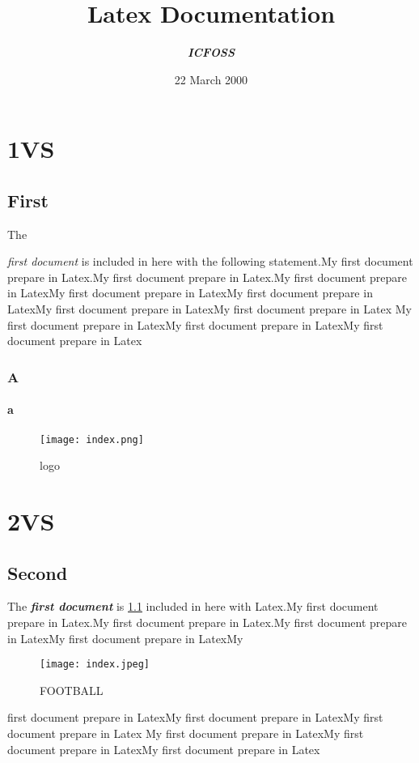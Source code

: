 \documentclass[12pt]{report} %
\begin{document}
\title{Latex Documentation}
\author{\textbf{\textit{ICFOSS}}}
\date{22 March 2000}
\maketitle

\chapter{1VS}
\section*{First}
The {\textit{first document} is included in here with the following statement.My first document prepare in Latex.My first document prepare in Latex.My first document prepare in LatexMy first document prepare in LatexMy first document prepare in LatexMy first document prepare in LatexMy first document prepare in Latex My first document prepare in LatexMy first document prepare in LatexMy first document prepare in Latex
\subsection*{A}
\subsubsection{a}

\begin{figure}
\centering
\texttt{[image: index.png]}
\caption{logo}
\label{vs}
\end{figure}

\chapter{2VS}
\section*{Second}
The \textit{\textbf{first document}} is \ref{vs}
included in here with Latex.My first document prepare in Latex.My first document prepare in Latex.My first document prepare in LatexMy first document prepare in LatexMy 

\begin{figure}[h!]
\texttt{[image: index.jpeg]}
\caption{FOOTBALL} %
\end{figure}

first document prepare in LatexMy first document prepare in LatexMy first document prepare in Latex My first document prepare in LatexMy first document prepare in LatexMy first document prepare in Latex
}
\end{document}
